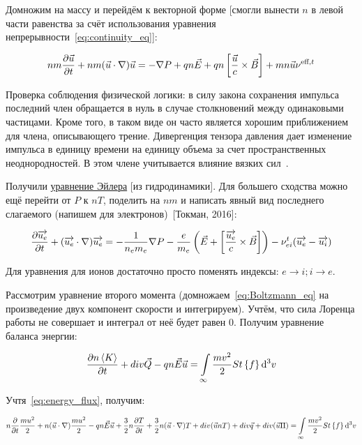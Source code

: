 \documentclass[10pt, a4paper]{article}
\newcommand{\Tokman}{~[Токман, 2016]}
\begin{document}
Домножим на массу и перейдём к векторной форме [смогли вынести $n$ в левой части равенства за счёт использования уравнения непрерывности~\eqref{eq:continuity_eq}]:

\begin{equation*}
	nm\pdv{\vec{u}}{t}+nm(\vec{u}\cdot\nabla)\vec{u}= -\nabla P +qn\vec{E}+qn\left[\frac{\vec{u}}{c}\times\vec{B}\right]+mn\vec{u}\nu^{\text{eff}, t}
\end{equation*}

Проверка соблюдения физической логики: в силу закона сохранения импульса последний член обращается в нуль в случае столкновений между одинаковыми частицами. Кроме того, в таком виде он часто является хорошим приближением
для члена, описывающего трение. Дивергенция тензора давления
дает изменение импульса в единицу времени на единицу объема за счет пространственных неоднородностей. В этом члене учитывается влияние вязких сил~\cite{kroll}. 

Получили \uline{уравнение Эйлера} [из гидродинамики]. Для большего сходства можно ещё перейти от $P$ к $nT$, поделить на $nm$ и написать явный вид последнего слагаемого (напишем для электронов)\Tokman:

\begin{equation} \label{eq:Euler_eq}
	\pdv{\overrightarrow{u_e}}{t}+(\overrightarrow{u_e}\cdot\nabla)\overrightarrow{u_e} = -\frac{1}{n_em_e}\nabla P -\frac{e}{m_e}\left(\vec{E}+\left[\frac{\overrightarrow{u_e}}{c}\times\vec{B}\right]\right)-\nu_{ei}^{t}(\overrightarrow{u_e}-\overrightarrow{u_i})
\end{equation}

Для уравнения для ионов достаточно просто поменять индексы: $e\rightarrow i; i\rightarrow e$.

Рассмотрим уравнение второго момента (домножаем~\eqref{eq:Boltzmann_eq} на произведение двух компонент скорости и интегрируем). Учтём, что сила Лоренца работы не совершает и интеграл от неё будет равен 0. Получим уравнение баланса энергии:

\begin{equation*}
	\pdv{n\left\langle K\right\rangle}{t}+div\vec{Q}-qn\vec{E}\vec{u}=\int\limits_\infty\frac{mv^2}{2}St\left\lbrace f\right\rbrace \dd[3]{v}
\end{equation*}

Учтя~\eqref{eq:energy_flux}, получим:

\begin{equation*}
	n\pdv{}{t}\frac{mu^2}{2}+n(\vec{u}\cdot\nabla)\frac{mu^2}{2}-qn\vec{E}\vec{u}+\frac{3}{2}n\pdv{T}{t}+\frac{3}{2}n(\vec{u}\cdot\nabla)T+div(\vec{u}nT)+div\vec{q}+div(\vec{u}\Pi)=\int\limits_\infty\frac{mv^2}{2}St\left\lbrace f\right\rbrace \dd[3]{v}
\end{equation*}
\end{document}
